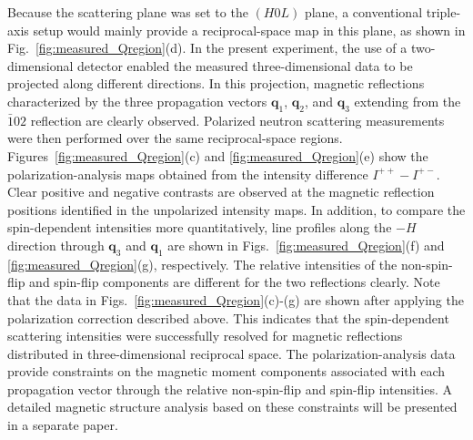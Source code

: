 \documentclass[%
 reprint,
superscriptaddress,
 amsmath,amssymb,
 aps,
]{revtex4-2}
\begin{document}
Because the scattering plane was set to the \((H0L)\) plane, a conventional triple-axis setup would mainly provide a reciprocal-space map in this plane, as shown in Fig.~\ref{fig:measured_Qregion}(d).
In the present experiment, the use of a two-dimensional detector enabled the measured three-dimensional data to be projected along different directions.
In this projection, magnetic reflections characterized by the three propagation vectors \(\boldsymbol{q}_1\), \(\boldsymbol{q}_2\), and \(\boldsymbol{q}_3\) extending from the \(\bar{1}02\) reflection are clearly observed.
Polarized neutron scattering measurements were then performed over the same reciprocal-space regions.
Figures~\ref{fig:measured_Qregion}(c) and \ref{fig:measured_Qregion}(e) show the polarization-analysis maps obtained from the intensity difference \(I^{++}-I^{+-}\).
Clear positive and negative contrasts are observed at the magnetic reflection positions identified in the unpolarized intensity maps.
In addition, to compare the spin-dependent intensities more quantitatively, line profiles along the \(-H\) direction through \(\boldsymbol{q}_3\) and \(\boldsymbol{q}_1\) are shown in Figs.~\ref{fig:measured_Qregion}(f) and \ref{fig:measured_Qregion}(g), respectively.
The relative intensities of the non-spin-flip and spin-flip components are different for the two reflections clearly.
Note that the data in Figs.~\ref{fig:measured_Qregion}(c)-(g) are shown after applying the polarization correction described above.
This indicates that the spin-dependent scattering intensities were successfully resolved for magnetic reflections distributed in three-dimensional reciprocal space.
The polarization-analysis data provide constraints on the magnetic moment components associated with each propagation vector through the relative non-spin-flip and spin-flip intensities.
A detailed magnetic structure analysis based on these constraints will be presented in a separate paper.
\end{document}
